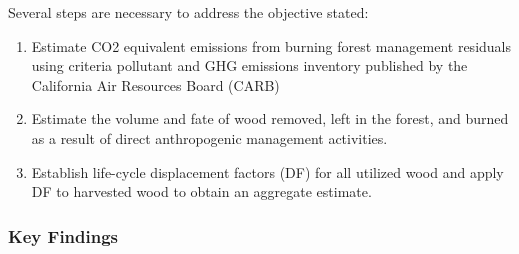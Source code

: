 \documentclass[a4paper]{article}
\begin{document}
Several steps are necessary to address the objective stated:

\begin{enumerate}
\item Estimate CO2 equivalent emissions from burning forest management
residuals using criteria pollutant and GHG emissions inventory
published by the California Air Resources Board (CARB)

\item Estimate the volume and fate of wood removed, left in the
forest, and burned as a result of direct anthropogenic management
activities.

\item Establish life-cycle displacement factors (DF) for all
utilized wood and apply DF to harvested wood to obtain an aggregate estimate.
\end{enumerate}

\subsubsection{Key Findings}
\label{sec:orgheadline1}
\end{document}
